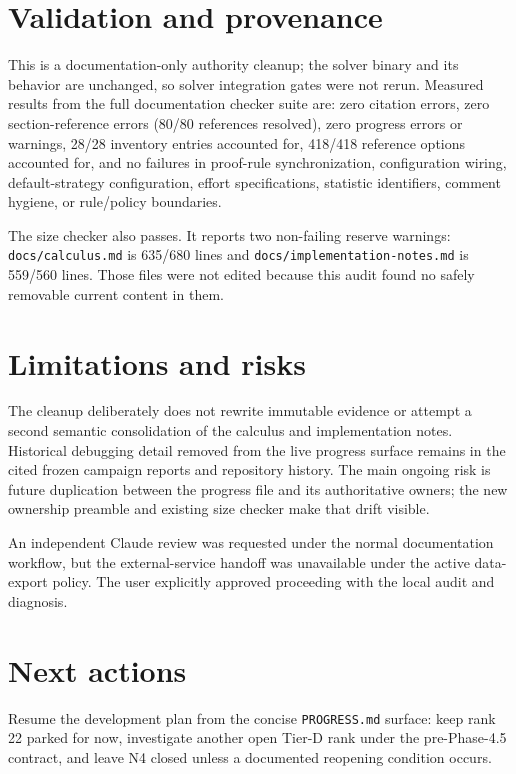 \documentclass[11pt]{article}
\begin{document}
\section{Validation and provenance}

This is a documentation-only authority cleanup; the solver binary and its
behavior are unchanged, so solver integration gates were not rerun.  Measured
results from the full documentation checker suite are: zero citation errors,
zero section-reference errors (80/80 references resolved), zero progress
errors or warnings, 28/28 inventory entries accounted for, 418/418 reference
options accounted for, and no failures in proof-rule synchronization,
configuration wiring, default-strategy configuration, effort specifications,
statistic identifiers, comment hygiene, or rule/policy boundaries.

The size checker also passes.  It reports two non-failing reserve warnings:
\texttt{docs/calculus.md} is 635/680 lines and
\texttt{docs/implementation-notes.md} is 559/560 lines.  Those files were not
edited because this audit found no safely removable current content in them.

\section{Limitations and risks}

The cleanup deliberately does not rewrite immutable evidence or attempt a
second semantic consolidation of the calculus and implementation notes.
Historical debugging detail removed from the live progress surface remains in
the cited frozen campaign reports and repository history.  The main ongoing
risk is future duplication between the progress file and its authoritative
owners; the new ownership preamble and existing size checker make that drift
visible.

An independent Claude review was requested under the normal documentation
workflow, but the external-service handoff was unavailable under the active
data-export policy.  The user explicitly approved proceeding with the local
audit and diagnosis.

\section{Next actions}

Resume the development plan from the concise \texttt{PROGRESS.md} surface:
keep rank 22 parked for now, investigate another open Tier-D rank under the
pre-Phase-4.5 contract, and leave N4 closed unless a documented reopening
condition occurs.
\end{document}

